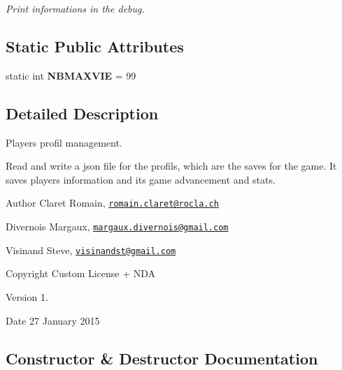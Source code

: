 \begin{DoxyCompactItemize}
\begin{DoxyCompactList}\small\item\em Print informations in the debug. \end{DoxyCompactList}\end{DoxyCompactItemize}
\subsection*{Static Public Attributes}
\begin{DoxyCompactItemize}
\item 
\hypertarget{class_g___profil_a7217587c918fc67887f48b8902b3eb70}{}static int {\bfseries N\+B\+M\+A\+X\+V\+I\+E} = 99\label{class_g___profil_a7217587c918fc67887f48b8902b3eb70}

\end{DoxyCompactItemize}


\subsection{Detailed Description}
Player\textquotesingle{}s profil management. 

Read and write a json file for the profils, which are the saves for the game. It saves player\textquotesingle{}s information and its game advancement and stats. \begin{DoxyAuthor}{Author}
Claret Romain, \href{mailto:romain.claret@rocla.ch}{\tt romain.\+claret@rocla.\+ch} 

Divernois Margaux, \href{mailto:margaux.divernois@gmail.com}{\tt margaux.\+divernois@gmail.\+com} 

Visinand Steve, \href{mailto:visinandst@gmail.com}{\tt visinandst@gmail.\+com} 
\end{DoxyAuthor}
\begin{DoxyCopyright}{Copyright}
Custom License + N\+D\+A 
\end{DoxyCopyright}
\begin{DoxyVersion}{Version}
1. 
\end{DoxyVersion}
\begin{DoxyDate}{Date}
27 January 2015 
\end{DoxyDate}


\subsection{Constructor \& Destructor Documentation}
\hypertarget{class_g___profil_a8e70c5c39cc069ceb2accc2b67851b06}{}
